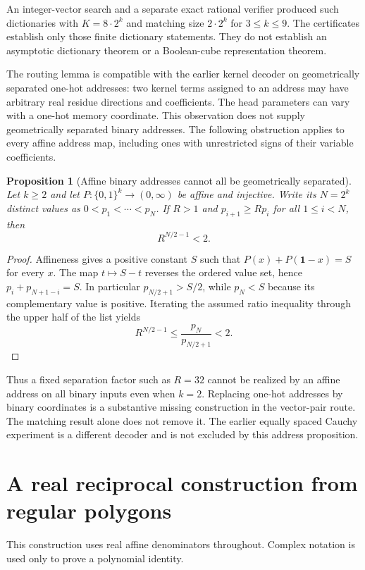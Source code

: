 \documentclass[11pt]{article}
\newtheorem{proposition}{Proposition}
\begin{document}
An integer-vector search and a separate exact rational verifier produced
such dictionaries with $K=8\cdot2^k$ and matching size $2\cdot2^k$
for $3\leq k\leq9$. The certificates establish only those finite
dictionary statements. They do not establish an asymptotic dictionary
theorem or a Boolean-cube representation theorem.

The routing lemma is compatible with the earlier kernel decoder on
geometrically separated one-hot addresses: two kernel terms assigned to an
address may have arbitrary real residue directions and coefficients.
The head parameters can vary with a one-hot memory coordinate. This
observation does not supply geometrically separated binary addresses.
The following obstruction applies to every affine address map, including
ones with unrestricted signs of their variable coefficients.

\begin{proposition}[Affine binary addresses cannot all be geometrically separated]
Let $k\geq2$ and let $P:\{0,1\}^k\longrightarrow(0,\infty)$ be
affine and injective. Write its $N=2^k$ distinct values as
$0<p_1<\cdots<p_N$. If $R>1$ and
$p_{i+1}\geq Rp_i$ for all $1\leq i<N$, then
\[
 R^{N/2-1}<2.
\]
\end{proposition}
\begin{proof}
Affineness gives a positive constant $S$ such that
$P(x)+P(\boldsymbol 1-x)=S$ for every $x$.
The map $t\mapsto S-t$ reverses the ordered value set, hence
$p_i+p_{N+1-i}=S$. In particular $p_{N/2+1}>S/2$, while
$p_N<S$ because its complementary value is positive. Iterating the
assumed ratio inequality through the upper half of the list yields
\[
 R^{N/2-1}\leq\frac{p_N}{p_{N/2+1}}<2.
\]
\end{proof}

Thus a fixed separation factor such as $R=32$ cannot be realized by
an affine address on all binary inputs even when $k=2$. Replacing
one-hot addresses by binary coordinates is a substantive missing
construction in the vector-pair route. The matching result alone does
not remove it. The earlier equally spaced Cauchy experiment is a
different decoder and is not excluded by this address proposition.

\section{A real reciprocal construction from regular polygons}

This construction uses real affine denominators throughout. Complex
notation is used only to prove a polynomial identity.
\end{document}
